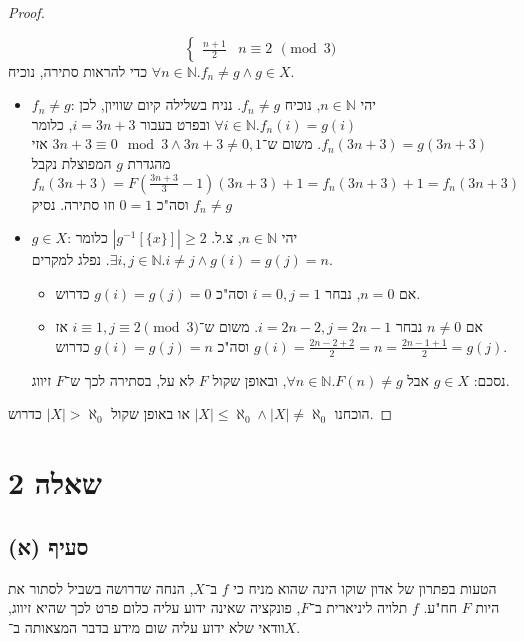 \documentclass[]{article}
\newcommand\N     {\mathbb{N}}
\newcommand\az    {\aleph_0}
\begin{document}
\begin{proof}
\begin{itemize}
\[\begin{cases}
				\tfrac{n + 1}{2} & n \equiv 2
			\end{cases} \pmod 3\]
		כדי להראות סתירה, נוכיח $ \forall n \in \N. f_n \neq g \land g \in X $. 
			\begin{itemize}
				\item $ f_n \neq g $: יהי $ n \in \N $, נוכיח $ f_n \neq g $. נניח בשלילה קיום שוויון, לכן $ \forall i \in \N. f_n(i) = g(i) $ ובפרט בעבור $ i = 3n + 3 $, כלומר $ f_n(3n + 3) = g(3n + 3) $. משום ש־$ 3n + 3 \equiv 0 \mod 3 \land 3n + 3 \neq 0, 1 $ אזי מהגדרת $ g $ המפוצלת נקבל $ f_n(3n + 3) = F(\tfrac{3n + 3}{3} - 1)(3n + 3) + 1 = f_n(3n + 3) + 1 = f_n(3n + 3) $ וסה"כ $ 0 = 1 $ וזו סתירה. נסיק $ f_n \neq g $
				\item $ g \in X $: יהי $ n \in \N $, צ.ל. $ |g^{-1}[\{x\}]| \ge 2 $ כלומר $ \exists i, j \in \N. i \neq j \land g(i) = g(j) = n $. נפלג למקרים. 
				\begin{itemize}
					\item אם $ n = 0 $, נבחר $ i = 0, j = 1 $ וסה"כ $ g(i) = g(j) = 0 $ כדרוש. 
					\item אם $ n \neq 0 $ נבחר $ i = 2n - 2, j = 2n - 1 $. משום ש־$ i \equiv 1, j \equiv 2 \pmod 3 $ אז $ g(i) = \tfrac{2n - 2 + 2}{2} = n = \tfrac{2n - 1 + 1}{2} = g(j)$ וסה"כ $ g(i) = g(j) = n $ כדרוש. 
				\end{itemize}
				נסכם: $ g \in X $ אבל $ \forall n \in \N. F(n) \neq g $, ובאופן שקול $ F $ לא על, בסתירה לכך ש־$ F $ זיווג. 
			\end{itemize}
		\end{itemize}
		הוכחנו $ |X| \le \az \land |X| \neq \az  $ או באופן שקול $ |X| > \az $ כדרוש. 
	\end{proof}
	\section*{שאלה 2}
	\subsection*{סעיף (א)}
	הטעות בפתרון של אדון שוקו הינה שהוא מניח כי $ f $ ב־$ X $, הנחה שדרושה בשביל לסתור את היות $ F $ חח"ע. $ f $ תלויה ליניארית ב־$ F $, פונקציה שאינה ידוע עליה כלום פרט לכך שהיא זיווג, וודאי שלא ידוע עליה שום מידע בדבר המצאותה ב־$ X $. 
\end{document}
